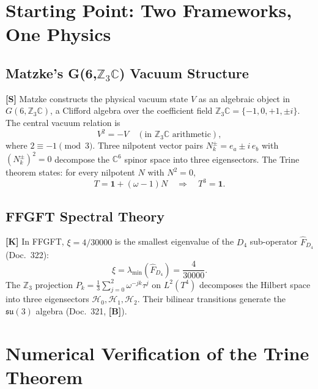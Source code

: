 \section{Starting Point: Two Frameworks, One Physics}

\subsection{Matzke's G(6,$\mathbb{Z}_3\mathbb{C}$) Vacuum Structure}

\textbf{[S]} Matzke constructs the physical vacuum state $V$ as an
algebraic object in $G(6, \mathbb{Z}_3\mathbb{C})$, a Clifford algebra
over the coefficient field
$\mathbb{Z}_3\mathbb{C} = \{-1, 0, +1, \pm i\}$.
The central vacuum relation is
\begin{equation}
  V^2 = -V \quad (\text{in } \mathbb{Z}_3\mathbb{C}\text{ arithmetic}),
  \label{eq:vakrel}
\end{equation}
where $2 \equiv -1 \pmod{3}$. Three nilpotent vector pairs
$N_k^{\pm} = e_a \pm i\,e_b$ with $(N_k^\pm)^2 = 0$ decompose the
$\mathbb{C}^6$ spinor space into three eigensectors.
The Trine theorem states: for every nilpotent $N$ with $N^2 = 0$,
\begin{equation}
  T = \mathbf{1} + (\omega-1)N \quad \Rightarrow \quad T^3 = \mathbf{1}.
  \label{eq:trine}
\end{equation}

\subsection{FFGFT Spectral Theory}

\textbf{[K]} In FFGFT, $\xi = 4/30000$ is the smallest eigenvalue
of the $D_4$ sub-operator $\hat{F}_{D_4}$ (Doc.~322):
\begin{equation}
  \xi = \lambda_{\min}(\hat{F}_{D_4}) = \frac{4}{30000}.
  \label{eq:xi_eigen}
\end{equation}
The $\mathbb{Z}_3$ projection $P_k = \frac{1}{3}\sum_{j=0}^2 \omega^{-jk}\tau^j$
on $L^2(T^4)$ decomposes the Hilbert space into three eigensectors
$\mathcal{H}_0, \mathcal{H}_1, \mathcal{H}_2$. Their bilinear transitions
generate the $\mathfrak{su}(3)$ algebra (Doc.~321, \textbf{[B]}).

\section{Numerical Verification of the Trine Theorem}

